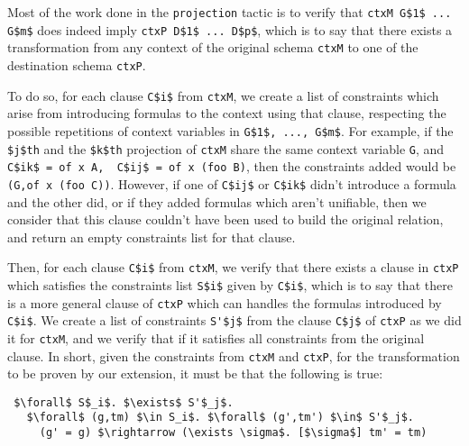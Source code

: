 \documentclass[nocopyrightspace,authoryear]{sigplanconf}
\begin{document}
Most of the work done in the \lstinline|projection| tactic is to verify that \lstinline|ctxM G$1$ ... G$m$| does indeed imply \lstinline|ctxP D$1$ ... D$p$|, which is to say that there exists a transformation from any context of the original schema \lstinline|ctxM| to one of the destination schema \lstinline|ctxP|.

To do so, for each clause \lstinline|C$i$| from \lstinline|ctxM|, we create a list of constraints which arise from introducing formulas to the context using that clause, respecting the possible repetitions of context variables in \lstinline|G$1$, ..., G$m$|. For example, if the \lstinline|$j$th| and the \lstinline|$k$th| projection of \lstinline|ctxM| share the same context variable \lstinline|G|, and \lstinline|C$ik$ = of x A,  C$ij$ = of x (foo B)|, then the constraints added would be \lstinline|(G,of x (foo C))|. However, if one of \lstinline|C$ij$| or \lstinline|C$ik$| didn't introduce a formula and the other did, or if they added formulas which aren't unifiable, then we consider that this clause couldn't have been used to build the original relation, and return an empty constraints list for that clause.

Then, for each clause \lstinline|C$i$| from \lstinline|ctxM|, we verify that there exists a clause in \lstinline|ctxP| which satisfies the constraints list \lstinline|S$i$| given by \lstinline|C$i$|, which is to say that there is a more general clause of \lstinline|ctxP| which can handles the formulas introduced by \lstinline|C$i$|. We create a list of constraints \lstinline|S'$j$| from the clause \lstinline|C$j$| of \lstinline|ctxP| as we did it for \lstinline|ctxM|, and we verify that if it satisfies all constraints from the original clause. In short, given the constraints from \lstinline|ctxM| and \lstinline|ctxP|, for the transformation to be proven by our extension, it must be that the following is true:
\begin{lstlisting}
 $\forall$ S$_i$. $\exists$ S'$_j$. 
   $\forall$ (g,tm) $\in S_i$. $\forall$ (g',tm') $\in$ S'$_j$. 
     (g' = g) $\rightarrow (\exists \sigma$. [$\sigma$] tm' = tm)
\end{lstlisting}



\begin{comment}
2:
To do so, for every \lstinline|D$i$ $\in$ D$1$, ..., D$p$|, we form the set 
\lstinline|S$_{i}$: { G$k$ $\mid$ D$i$ = G$k$ $\wedge$ G$k$ $\in$ G$1$, ..., G$m$}|. 
Then, for each such \lstinline|S$_i$| and for each clause \lstinline|C$j$| in the original schema \lstinline|ctxM|, we unify, for each \lstinline|G$k$ $\in$ S$_i$|, \lstinline|C$jk$| together as \lstinline|CR$ij$| , and verify that there exists a clause \lstinline|C'$l$| in the destination schema \lstinline|ctxP| such that \lstinline|CR$ij$| matches \lstinline|C'$li$|.
\end{comment}
\end{document}
